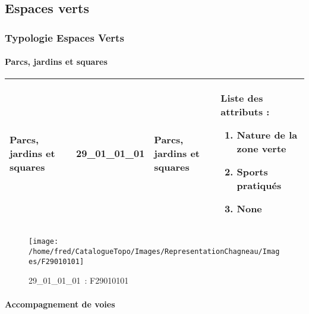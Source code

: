 \documentclass[12pt,titlepage,oneside]{book}
\begin{document}
\subsection{Espaces verts}
\subsubsection{\large Typologie Espaces Verts}
\paragraph{Parcs, jardins et squares}
\noindent
\vspace{\baselineskip}

\renewcommand{\arraystretch}{1.2}
\begin{supertabular}{|p{10cm}|c|p{13cm}|p{12cm}|}
 Parcs, jardins et squares & 29\_01\_01\_01 & Parcs, jardins et squares & Liste des attributs :
\begin{enumerate}
  \item Nature de la zone verte  \item Sports pratiqués  \item None\end{enumerate}
\\
\hline
\end{supertabular}
\begin{figure}[h!]
  \hfill         %
  \begin{minipage}[t]{3cm}
    \begin{center}
      \texttt{[image: /home/fred/CatalogueTopo/Images/RepresentationChagneau/Images/F29010101]}
      \caption[~29\_01\_01\_01]{\small{29\_01\_01\_01~:} \tiny{F29010101}}\label{F29010101}
    \end{center}
  \end{minipage}
\end{figure}


\paragraph{Accompagnement de voies}
\noindent
\vspace{\baselineskip}
\end{document}
